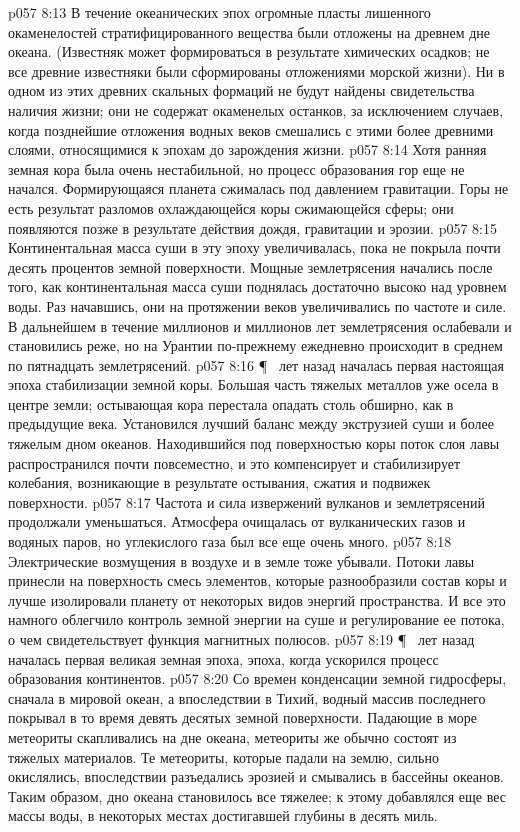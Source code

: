 \vs p057 8:13 В течение океанических эпох огромные пласты лишенного окаменелостей стратифицированного вещества были отложены на древнем дне океана. (Известняк может формироваться в результате химических осадков; не все древние известняки были сформированы отложениями морской жизни). Ни в одном из этих древних скальных формаций не будут найдены свидетельства наличия жизни; они не содержат окаменелых останков, за исключением случаев, когда позднейшие отложения водных веков смешались с этими более древними слоями, относящимися к эпохам до зарождения жизни.
\vs p057 8:14 Хотя ранняя земная кора была очень нестабильной, но процесс образования гор еще не начался. Формирующаяся планета сжималась под давлением гравитации. Горы не есть результат разломов охлаждающейся коры сжимающейся сферы; они появляются позже в результате действия дождя, гравитации и эрозии.
\vs p057 8:15 Континентальная масса суши в эту эпоху увеличивалась, пока не покрыла почти десять процентов земной поверхности. Мощные землетрясения начались после того, как континентальная масса суши поднялась достаточно высоко над уровнем воды. Раз начавшись, они на протяжении веков увеличивались по частоте и силе. В дальнейшем в течение миллионов и миллионов лет землетрясения ослабевали и становились реже, но на Урантии по\hyp{}прежнему ежедневно происходит в среднем по пятнадцать землетрясений.
\vs p057 8:16 \P\  лет назад началась первая настоящая эпоха стабилизации земной коры. Большая часть тяжелых металлов уже осела в центре земли; остывающая кора перестала опадать столь обширно, как в предыдущие века. Установился лучший баланс между экструзией суши и более тяжелым дном океанов. Находившийся под поверхностью коры поток слоя лавы распространился почти повсеместно, и это компенсирует и стабилизирует колебания, возникающие в результате остывания, сжатия и подвижек поверхности.
\vs p057 8:17 Частота и сила извержений вулканов и землетрясений продолжали уменьшаться. Атмосфера очищалась от вулканических газов и водяных паров, но углекислого газа был все еще очень много.
\vs p057 8:18 Электрические возмущения в воздухе и в земле тоже убывали. Потоки лавы принесли на поверхность смесь элементов, которые разнообразили состав коры и лучше изолировали планету от некоторых видов энергий пространства. И все это намного облегчило контроль земной энергии на суше и регулирование ее потока, о чем свидетельствует функция магнитных полюсов.
\vs p057 8:19 \P\  лет назад началась первая великая земная эпоха, эпоха, когда ускорился процесс образования континентов.
\vs p057 8:20 Со времен конденсации земной гидросферы, сначала в мировой океан, а впоследствии в Тихий, водный массив последнего покрывал в то время девять десятых земной поверхности. Падающие в море метеориты скапливались на дне океана, метеориты же обычно состоят из тяжелых материалов. Те метеориты, которые падали на землю, сильно окислялись, впоследствии разъедались эрозией и смывались в бассейны океанов. Таким образом, дно океана становилось все тяжелее; к этому добавлялся еще вес массы воды, в некоторых местах достигавшей глубины в десять миль.
